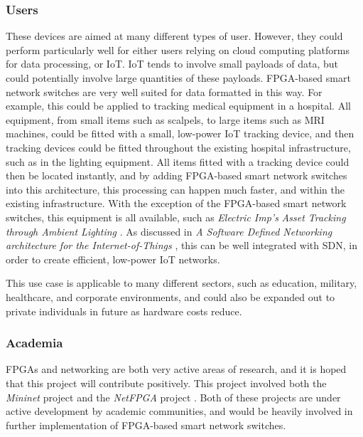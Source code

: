 \subsubsection{Users}
These devices are aimed at many different types of user. However, they could perform particularly well for either users relying on cloud computing platforms for data processing, or IoT. IoT tends to involve small payloads of data, but could potentially involve large quantities of these payloads. FPGA-based smart network switches are very well suited for data formatted in this way.
For example, this could be applied to tracking medical equipment in a hospital. All equipment, from small items such as scalpels, to large items such as MRI machines, could be fitted with a small, low-power IoT tracking device, and then tracking devices could be fitted throughout the existing hospital infrastructure, such as in the lighting equipment.
All items fitted with a tracking device could then be located instantly, and by adding FPGA-based smart network switches into this architecture, this processing can happen much faster, and within the existing infrastructure.
With the exception of the FPGA-based smart network switches, this equipment is all available, such as \textit{Electric Imp's} \textit{Asset Tracking through Ambient Lighting} \cite{electric_imp} \cite{electric_imp_asset_tracking}.
As discussed in \textit{A Software Defined Networking architecture for the Internet-of-Things} \cite{6838365}, this can be well integrated with SDN, in order to create efficient, low-power IoT networks.

This use case is applicable to many different sectors, such as education, military, healthcare, and corporate environments, and could also be expanded out to private individuals in future as hardware costs reduce.

\subsubsection{Academia}
FPGAs and networking are both very active areas of research, and it is hoped that this project will contribute positively. This project involved both the \textit{Mininet} project \cite{mininet} and the \textit{NetFPGA} project \cite{NetFPGA}. Both of these projects are under active development by academic communities, and would be heavily involved in further implementation of FPGA-based smart network switches.
